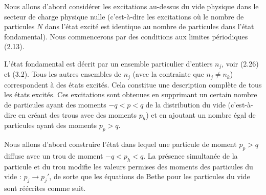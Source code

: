 Nous allons d'abord considérer les excitations au-dessus du vide physique dans le secteur de charge physique nulle (c'est-à-dire les excitations où le nombre de particules \( N \) dans l'état excité est identique au nombre de particules dans l'état fondamental). Nous commencerons par des conditions aux limites périodiques (2.13).

L'état fondamental est décrit par un ensemble particulier d'entiers \( n_j \), voir (2.26) et (3.2). Tous les autres ensembles de \( n_j \) (avec la contrainte que \( n_j \neq n_k \)) correspondent à des états excités. Cela constitue une description complète de tous les états excités. Ces excitations sont obtenues en supprimant un certain nombre de particules ayant des moments \( -q < p < q \) de la distribution du vide (c'est-à-dire en créant des trous avec des moments \( p_h \)) et en ajoutant un nombre égal de particules ayant des moments \( p_p > q \).

Nous allons d'abord construire l'état dans lequel une particule de moment \( p_p > q \) diffuse avec un trou de moment \( -q < p_h < q \). La présence simultanée de la particule et du trou modifie les valeurs permises des moments des particules du vide : \( p_j \to p_j' \), de sorte que les équations de Bethe pour les particules du vide sont réécrites comme suit.
